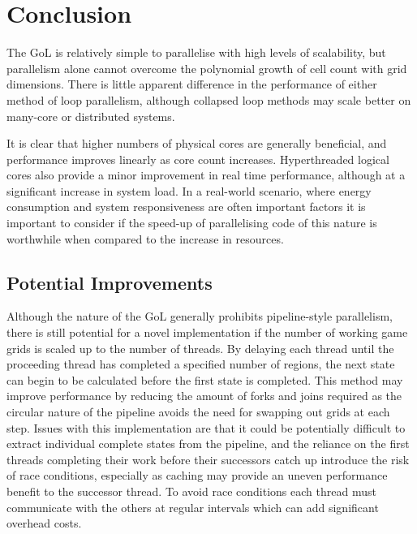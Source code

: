 \documentclass[]{article}
\begin{document}
\section{Conclusion}
The GoL is relatively simple to parallelise with high levels of scalability, but parallelism alone cannot overcome the polynomial growth of cell count with grid dimensions. There is little apparent difference in the performance of either method of loop parallelism, although collapsed loop methods may scale better on many-core or distributed systems.

It is clear that higher numbers of physical cores are generally beneficial, and performance improves linearly as core count increases. Hyperthreaded logical cores also provide a minor improvement in real time performance, although at a significant increase in system load. In a real-world scenario, where energy consumption and system responsiveness are often important factors it is important to consider if the speed-up of parallelising code of this nature is worthwhile when compared to the increase in resources.

\subsection{Potential Improvements}
Although the nature of the GoL generally prohibits pipeline-style parallelism, there is still potential for a novel implementation if the number of working game grids is scaled up to the number of threads. By delaying each thread until the proceeding thread has completed a specified number of regions, the next state can begin to be calculated before the first state is completed. This method may improve performance by reducing the amount of forks and joins required as the circular nature of the pipeline avoids the need for swapping out grids at each step. Issues with this implementation are that it could be potentially difficult to extract individual complete states from the pipeline, and the reliance on the first threads completing their work before their successors catch up introduce the risk of race conditions, especially as caching may provide an uneven performance benefit to the successor thread. To avoid race conditions each thread must communicate with the others at regular intervals which can add significant overhead costs.
\end{document}

